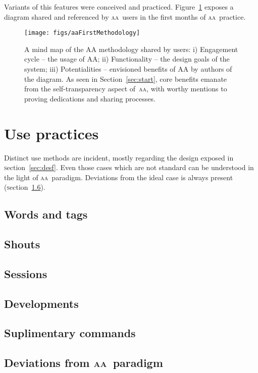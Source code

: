 \documentclass[a4paper, 11pt]{article} %
\newcommand{\sectionb}{\textsc{s}ection}
\newcommand{\aab}{\textsc{aa}}
\begin{document}
Variants of this features were conceived and practiced. Figure~\ref{fig:consult} exposes a diagram shared and referenced by \aab\ users in the first months of \aab\ practice.


\begin{figure}[!h]
    \centering
    \texttt{[image: figs/aaFirstMethodology]}
    \caption{A mind map of the AA methodology shared by users: i) Engagement cycle – the usage of AA; ii) Functionality – the design goals of the system; iii) Potentialities – envisioned benefits of AA by authors of the diagram. As seen in Section~\ref{sec:start}, core benefits emanate from the self-transparency aspect of~\aab, with worthy mentions to proving dedications and sharing processes.} 
    \label{fig:consult}
\end{figure}




\section{Use practices}\label{sec:use}
Distinct use methods are incident, mostly regarding the design exposed in \sectionb~\ref{sec:desf}. Even those cases which are not standard can be understood in the light of \aab\ paradigm. Deviations from the ideal case is always present (\sectionb~\ref{sec:devia}).

\subsection{Words and tags}\label{sec:usewt}
\subsection{Shouts}\label{sec:usesh}
\subsection{Sessions}\label{sec:usess}
\subsection{Developments}\label{sec:usedev}
\subsection{Suplimentary commands}\label{sec:usesc}
\subsection{Deviations from \aab\ paradigm}\label{sec:devia}
\end{document}
